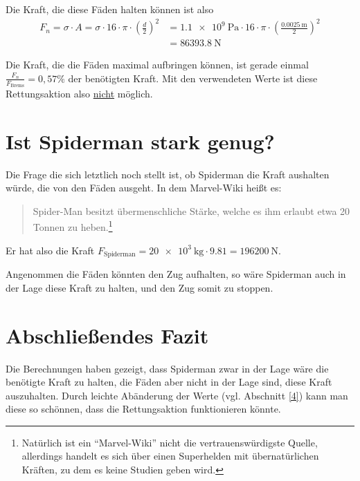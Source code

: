 \documentclass[a4paper, 11pt, nofonts, 
twoside, sfsidenotes, nobib, justified]{tufte-handout}
\begin{document}
Die Kraft, die diese Fäden halten können ist also
\begin{align*}
	F_n=\sigma \cdot A = \sigma \cdot 16 \cdot \pi \cdot \left(\frac d2\right)^2 &= \SI{1.1e9}{\pascal} \cdot 16\cdot \pi \cdot\left(\frac{\SI{0.0025}{\meter}}{2}\right)^2\\&=\SI{86393.8}{\newton} 
\end{align*}
\begin{mdframed}[style = wichtig, frametitle = {Fazit}]
	Die Kraft, die die Fäden maximal aufbringen können, ist gerade einmal $\frac{F_n}{F_\text{Brems}}=0,57\%$ der benötigten Kraft. Mit den verwendeten Werte ist diese Rettungsaktion also \underline{nicht} möglich.
\end{mdframed}
\section{Ist Spiderman stark genug?}
Die Frage die sich letztlich noch stellt ist, ob Spiderman die Kraft aushalten würde, die von den Fäden ausgeht. In dem Marvel-Wiki \cite{WSem10} heißt es:
\begin{quote} 
	Spider-Man besitzt übermenschliche Stärke, welche es ihm erlaubt etwa 20 Tonnen zu heben.\footnote{Natürlich ist ein ``Marvel-Wiki'' nicht die vertrauenswürdigste Quelle, allerdings handelt es sich über einen Superhelden mit übernatürlichen Kräften, zu dem es keine Studien geben wird.}
\end{quote}
Er hat also die Kraft $F_\text{Spiderman}=\SI{20e3}{\kilogram}\cdot 9.81=\SI{196200}{\newton}$.
\begin{mdframed}[style = wichtig, frametitle = Fazit]
	Angenommen die Fäden könnten den Zug aufhalten, so wäre Spiderman auch in der Lage diese Kraft zu halten, und den Zug somit zu stoppen.
\end{mdframed}
%
\section{Abschließendes Fazit}
Die Berechnungen haben gezeigt, dass Spiderman zwar in der Lage wäre die benötigte Kraft zu halten, die Fäden aber nicht in der Lage sind, diese Kraft auszuhalten. Durch leichte Abänderung der Werte (vgl. Abschnitt \ref{4}) kann man diese so schönnen, dass die Rettungsaktion funktionieren könnte.
\end{document}
